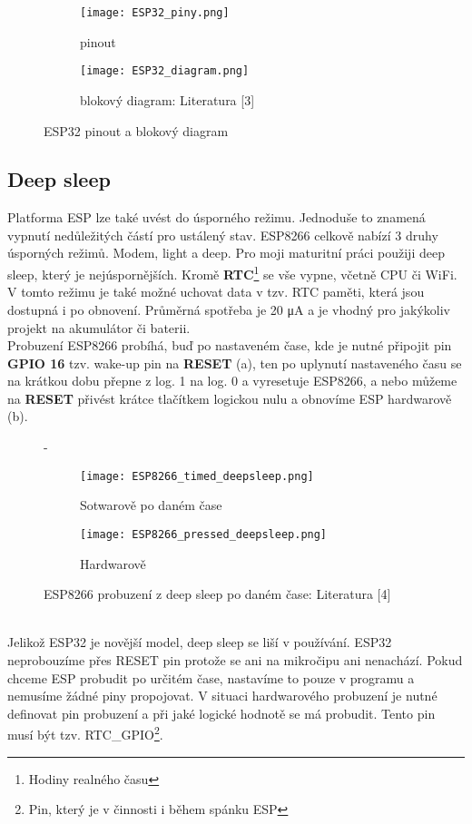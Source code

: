 \documentclass[a4paper, 12pt]{report}
\begin{document}
					\begin{figure}[h!]
					  \centering
					  \begin{subfigure}[b]{0.4\linewidth}
					    \texttt{[image: ESP32\_piny.png]}
					    \caption{pinout}
					  \end{subfigure}
					  \begin{subfigure}[b]{0.4\linewidth}
					    \texttt{[image: ESP32\_diagram.png]}
					    \caption{blokový diagram: Literatura [3]}
					  \end{subfigure}
					  \caption{ESP32 pinout a blokový diagram}
					  \label{ESP32_diagram_pinout}
					\end{figure}

				\subsection{Deep sleep} \label{subsub:Deep sleep}
					Platforma ESP lze také uvést do úsporného režimu. Jednoduše to znamená vypnutí nedůležitých částí pro ustálený stav. ESP8266 celkově nabízí 3 druhy úsporných režimů. Modem, light a deep. Pro moji maturitní práci použiji deep sleep, který je nejúspornějších. Kromě {\bf RTC}\footnote{Hodiny realného času} se vše vypne, včetně CPU či WiFi. V tomto režimu je také možné uchovat data v tzv. RTC paměti, která jsou dostupná i po obnovení. Průměrná spotřeba je 20 \si{\micro A} a je vhodný pro jakýkoliv projekt na akumulátor či baterii. \\
					Probuzení ESP8266 probíhá, buď po nastaveném čase, kde je nutné připojit pin {\bf GPIO 16} tzv. wake-up pin na {\bf RESET} (a), ten po uplynutí nastaveného času se na krátkou dobu přepne z log. 1 na log. 0 a vyresetuje ESP8266, a nebo můžeme na {\bf RESET} přivést krátce tlačítkem logickou nulu a obnovíme ESP hardwarově (b).
					\begin{figure}[h!]
					  \centering-
					  \begin{subfigure}[b]{0.4\linewidth}
					    \texttt{[image: ESP8266\_timed\_deepsleep.png]}
					    \caption{Sotwarově po daném čase}
					  \end{subfigure}
					  \begin{subfigure}[b]{0.4\linewidth}
					    \texttt{[image: ESP8266\_pressed\_deepsleep.png]}
					    \caption{Hardwarově}
					  \end{subfigure}
					  \caption{ESP8266 probuzení z deep sleep po daném čase: Literatura [4]}
					  \label{ESP8266_timed_pressed_deepsleep}
					\end{figure}\\
					Jelikož ESP32 je novější model, deep sleep se liší v používání. ESP32 neprobouzíme přes RESET pin protože se ani na mikročipu ani nenachází. Pokud chceme ESP probudit po určitém čase, nastavíme to pouze v programu a nemusíme žádné piny propojovat. V situaci hardwarového probuzení je nutné definovat pin probuzení a při jaké logické hodnotě se má probudit. Tento pin musí být tzv. RTC\_GPIO\footnote{Pin, který je v činnosti i během spánku ESP}.
\end{document}
